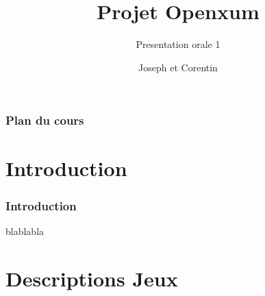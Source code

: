 \documentclass[11pt]{beamer}
\begin{document}
	
\author[J.Delaeter C.Ghyselinck]{Joseph  et Corentin }
\title{Projet Openxum}
\subtitle{Presentation orale 1}

  \begin{frame}[plain]
  \maketitle
  \end{frame}

  \begin{frame}
	\frametitle{Plan du cours}
	\tableofcontents
	\end{frame}
\section[Introduction]{Introduction}
  \begin{frame}
  \frametitle{Introduction}
  
  blablabla
  \end{frame}
\section[Description Jeux]{Descriptions Jeux} 
\end{document}
